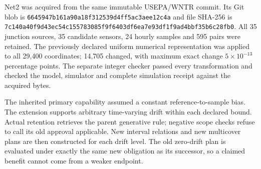 \documentclass[
  11pt,
]{article}
\begin{document}
Net2 was acquired from the same immutable USEPA/WNTR commit. Its Git
blob is \nolinkurl{6645947b161a90a18f312539d4ff5ac3aee12c4a} and file
SHA-256 is
\nolinkurl{7c140a40f9d43ec54c155783085f9f6403df6ea7e93df1f9ad4bbf35b6c28fb0}.
All 35 junction sources, 35 candidate sensors, 24 hourly samples and 595
pairs were retained. The previously declared uniform numerical
representation was applied to all 29,400 coordinates; 14,705 changed,
with maximum exact change \(5\times10^{-13}\) percentage points. The
separate integer checker passed every transformation and checked the
model, simulator and complete simulation receipt against the acquired
bytes.

The inherited primary capability assumed a constant reference-to-sample
bias. The extension supports arbitrary time-varying drift within each
declared bound. Actual retention retrieves the parent generative rule;
negative scope checks refuse to call its old approval applicable. New
interval relations and new multicover plans are then constructed for
each drift level. The old zero-drift plan is evaluated under exactly the
same new obligation as its successor, so a claimed benefit cannot come
from a weaker endpoint.
\end{document}
